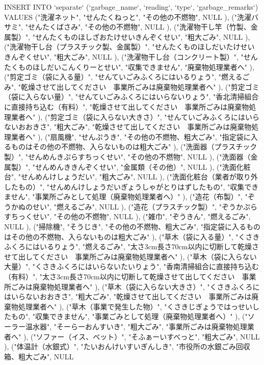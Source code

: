 INSERT INTO `separate` (`garbage_name`, `reading`, `type`, `garbage_remarks`) VALUES
("洗濯ネット", "せんたくねっと", "その他の不燃物", NULL
), ("洗濯バサミ", "せんたくばさみ", "その他の不燃物", NULL
), ("洗濯物干し竿（竹製、金属製）", "せんたくものほしざおたけせいきんぞくせい", "粗大ごみ", NULL
), ("洗濯物干し台（プラスチック製、金属製）", "せんたくものほしだいたけせいきんぞくせい", "粗大ごみ", NULL
), ("洗濯物干し台（コンクリート製）", "せんたくものほしだいこんくりーとせい", "収集できません", "廃棄物処理業者へ"
), ("剪定ゴミ（袋に入る量）", "せんていごみふくろにはいるりょう", "燃えるごみ", "乾燥させて出してください　事業所ごみは廃棄物処理業者へ"
), ("剪定ゴミ（袋に入らない量）", "せんていごみふくろにはいらないりょう", "香北清掃組合に直接持ち込む（有料）", "乾燥させて出してください　事業所ごみは廃棄物処理業者へ"
), ("剪定ゴミ（袋に入らない大きさ）", "せんていごみふくろにはいらないおおきさ", "粗大ごみ", "乾燥させて出してください　事業所ごみは廃棄物処理業者へ"
), ("扇風機", "せんぷうき", "その他の不燃物、粗大ごみ", "指定袋に入るものはその他の不燃物、入らないものは粗大ごみ"
), ("洗面器（プラスチック製）", "せんめんきぷらすちっくせい", "その他の不燃物", NULL
), ("洗面器（金属製）", "せんめんききんぞくせい", "金属類（その他）", NULL
), ("洗面化粧台", "せんめんけしょうだい", "粗大ごみ", NULL
), ("洗面化粧台（業者が取り外したもの）", "せんめんけしょうだいぎょうしゃがとりはずしたもの", "収集できません", "事業所ごみとして処理（廃棄物処理業者へ）"
), ("造花（布製）", "ぞうかぬのせい", "燃えるごみ", NULL
), ("造花（プラスチック製）", "ぞうかぷらすちっくせい", "その他の不燃物", NULL
), ("雑巾", "ぞうきん", "燃えるごみ", NULL
), ("掃除機", "そうじき", "その他の不燃物、粗大ごみ", "指定袋に入るものはその他の不燃物、入らないものは粗大ごみ"
), ("草木（袋に入る量）", "くさきふくろにはいるりょう", "燃えるごみ", "太さ3cm長さ70cm以内に切断して乾燥させて出してください　事業所ごみは廃棄物処理業者へ"
), ("草木（袋に入らない大量）", "くさきふくろにはいらないたいりょう", "香南清掃組合に直接持ち込む（有料）", "太さ3cm長さ70cm以内に切断して乾燥させて出してください　事業所ごみは廃棄物処理業者へ"
), ("草木（袋に入らない大きさ）", "くさきふくろにはいらないおおきさ", "粗大ごみ", "乾燥させて出してください　事業所ごみは廃棄物処理業者へ"
), ("草木（事業で発生した物）", "くさきじぎょうではっせいしたもの", "収集できません", "事業ごみとして処理（廃棄物処理業者へ）"
), ("ソーラー温水器", "そーらーおんすいき", "粗大ごみ", "事業所ごみは廃棄物処理業者へ"
), ("ソファー（イス、ベット）", "そふぁーいすべっと", "粗大ごみ", NULL
), ("体温計（水銀式）", "たいおんけいすいぎんしき", "市役所の水銀ごみ回収箱、粗大ごみ", NULL
